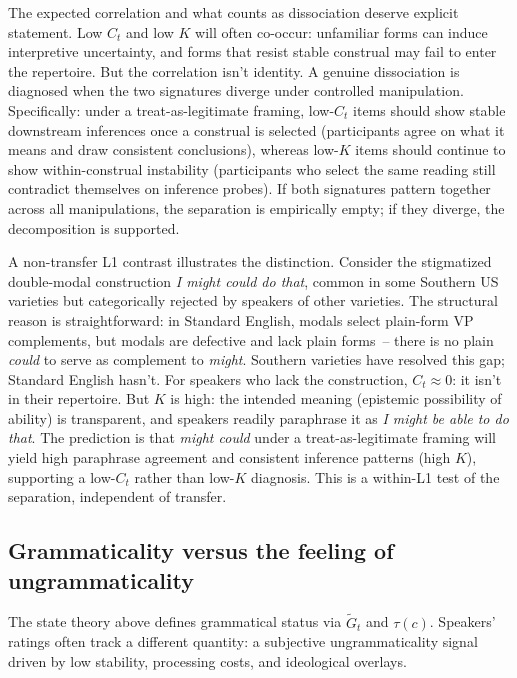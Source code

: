 \documentclass[12pt,letterpaper]{article}
\newcommand{\mention}[1]{\textit{#1}}
\begin{document}
The expected correlation and what counts as dissociation deserve explicit statement. Low $C_t$ and low $K$ will often co-occur: unfamiliar forms can induce interpretive uncertainty, and forms that resist stable construal may fail to enter the repertoire. But the correlation isn't identity. A genuine dissociation is diagnosed when the two signatures diverge under controlled manipulation. Specifically: under a treat-as-legitimate framing, low-$C_t$ items should show stable downstream inferences once a construal is selected (participants agree on what it means and draw consistent conclusions), whereas low-$K$ items should continue to show within-construal instability (participants who select the same reading still contradict themselves on inference probes). If both signatures pattern together across all manipulations, the separation is empirically empty; if they diverge, the decomposition is supported.

A non-transfer L1 contrast illustrates the distinction. Consider the stigmatized double-modal construction \mention{I might could do that}, common in some Southern US varieties but categorically rejected by speakers of other varieties. The structural reason is straightforward: in Standard English, modals select plain-form VP complements, but modals are defective and lack plain forms~-- there is no plain \mention{could} to serve as complement to \mention{might}. Southern varieties have resolved this gap; Standard English hasn't. For speakers who lack the construction, $C_t\approx 0$: it isn't in their repertoire. But $K$ is high: the intended meaning (epistemic possibility of ability) is transparent, and speakers readily paraphrase it as \mention{I might be able to do that}. The prediction is that \mention{might could} under a treat-as-legitimate framing will yield high paraphrase agreement and consistent inference patterns (high $K$), supporting a low-$C_t$ rather than low-$K$ diagnosis. This is a within-L1 test of the separation, independent of transfer.

\subsection{Grammaticality versus the feeling of ungrammaticality}

The state theory above defines grammatical status via $\widetilde{G}_t$ and $\tau(c)$. Speakers' ratings often track a different quantity: a subjective ungrammaticality signal driven by low stability, processing costs, and ideological overlays.
\end{document}
